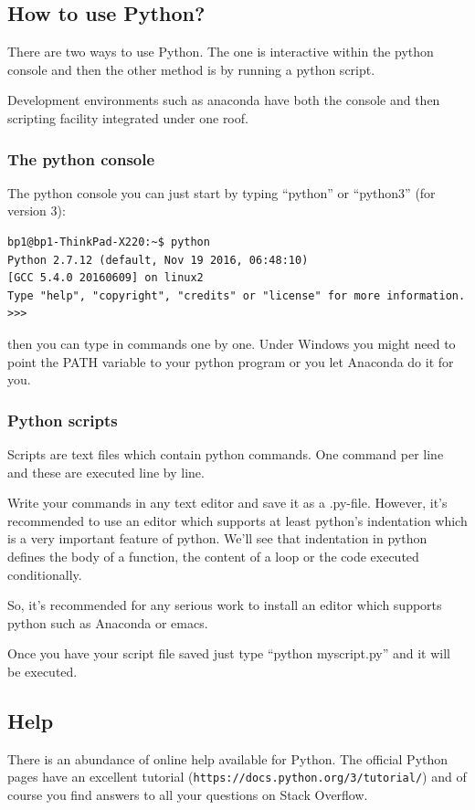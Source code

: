 \documentclass[12pt,a4paper]{article}
\begin{document}
\subsection{How to use Python?}
There are two ways to use Python. The one is interactive within
the python console and then the other method is by running
a python script.

Development environments such as anaconda have both the
console and then scripting facility integrated under one
roof.

\subsubsection{The python console}
The python console you can just start by typing
``python'' or ``python3'' (for version 3):
\begin{verbatim}
bp1@bp1-ThinkPad-X220:~$ python
Python 2.7.12 (default, Nov 19 2016, 06:48:10) 
[GCC 5.4.0 20160609] on linux2
Type "help", "copyright", "credits" or "license" for more information.
>>> 
\end{verbatim}
then you can type in commands one by one. Under Windows you might
need to point the PATH variable to your python program or you let Anaconda
do it for you.

\subsubsection{Python scripts}
Scripts are text files which contain python commands. One command
per line and these are executed line by line.

Write your commands in any text editor and save it as a
.py-file. However, it's recommended to use an editor which supports at
least python's indentation which is a very important feature of python.
We'll see that indentation in python
defines the body of a function, the content of a loop or the code
executed conditionally.

So, it's recommended for any serious
work to install an editor which supports python such as Anaconda
or emacs.

Once you have your script file saved just type ``python myscript.py''
and it will be executed.

\subsection{Help}
There is an abundance of online help available for Python. The
official Python pages have an excellent tutorial
(\texttt{https://docs.python.org/3/tutorial/}) and of course you find
answers to all your questions on Stack Overflow.
\end{document}
